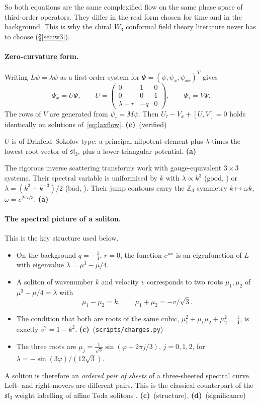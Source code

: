 \documentclass[11pt,a4paper]{article}
\newcommand{\La}{\textsf{\textbf{(a)}}}
\newcommand{\Lc}{\textsf{\textbf{(c)}}}
\newcommand{\Ld}{\textsf{\textbf{(d)}}}
\newcommand{\script}[1]{\texttt{scripts/#1}}
\theoremstyle{remark}
\begin{document}
So both equations are the same complexified flow on the same phase space of third-order operators. They differ in the real form chosen for time and in the background. This is why the chiral $W_3$ conformal field theory literature never has to choose (\S\ref{sec:w3}).

\paragraph{Zero-curvature form.} Writing $L\psi=\lambda\psi$ as a first-order system for $\Psi=(\psi,\psi_x,\psi_{xx})^T$ gives
\[
\Psi_x=U\Psi,\qquad U=\begin{pmatrix}0&1&0\\0&0&1\\\lambda-r&-q&0\end{pmatrix},\qquad \Psi_\tau=V\Psi .
\]
The rows of $V$ are generated from $\psi_\tau=M\psi$. Then $U_\tau-V_x+[U,V]=0$ holds identically on solutions of~\eqref{eq:laxflow}. \Lc\ (verified)

$U$ is of Drinfeld--Sokolov type: a principal nilpotent element plus $\lambda$ times the lowest root vector of $\mathfrak{sl}_3$, plus a lower-triangular potential. \La~\cite{DS}

The rigorous inverse scattering transforms \cite{CL-GB,CL-WW,CL-SOL} work with gauge-equivalent $3\times3$ systems. Their spectral variable is uniformised by $k$ with $\lambda\propto k^3$ (good, \cite[(3.1)]{CL-GB}) or $\lambda=(k^3+k^{-3})/2$ (bad, \cite[(3.2)]{CL-WW}). Their jump contours carry the $\mathbb Z_3$ symmetry $k\mapsto\omega k$, $\omega=e^{2\pi i/3}$. \La

\paragraph{The spectral picture of a soliton.} This is the key structure used below.
\begin{itemize}
\item On the background $q=-\frac14$, $r=0$, the function $e^{\mu x}$ is an eigenfunction of $L$ with eigenvalue $\lambda=\mu^3-\mu/4$.
\item A soliton of wavenumber $k$ and velocity $v$ corresponds to two roots $\mu_1,\mu_2$ of $\mu^3-\mu/4=\lambda$ with
\begin{equation}\label{eq:mu}
\mu_1-\mu_2=k,\qquad \mu_1+\mu_2=-v/\sqrt3 .
\end{equation}
\item The condition that both are roots of the same cubic, $\mu_1^2+\mu_1\mu_2+\mu_2^2=\frac14$, is exactly $v^2=1-k^2$. \Lc\ (\script{charges.py})
\item The three roots are $\mu_j=\frac1{\sqrt3}\sin(\varphi+2\pi j/3)$, $j=0,1,2$, for $\lambda=-\sin(3\varphi)/(12\sqrt3)$.
\end{itemize}
A soliton is therefore an \emph{ordered pair of sheets} of a three-sheeted spectral curve. Left- and right-movers are different pairs. This is the classical counterpart of the $\mathfrak{sl}_3$ weight labelling of affine Toda solitons \cite{Hol92}. \Lc\ (structure), \Ld\ (significance)
\end{document}
